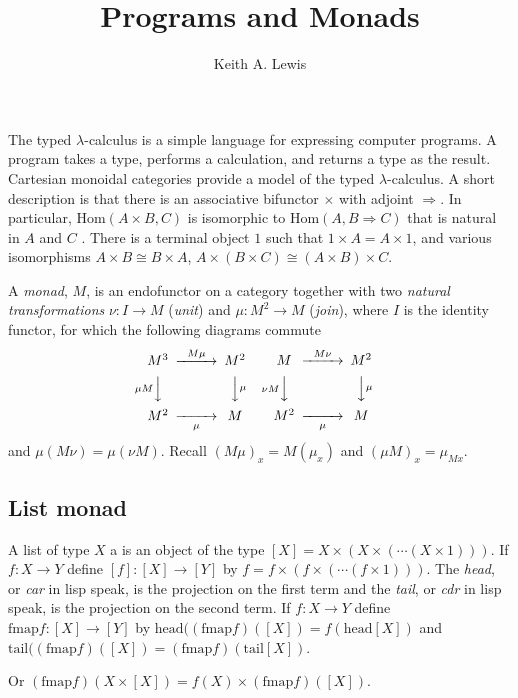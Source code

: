 \documentclass[12pt,letterpaper,fleqn]{report}
\author{Keith A. Lewis}
\title{Programs and Monads}
\begin{document}
\maketitle
The typed \(\lambda\)-calculus is a simple language for expressing computer
programs. A program takes a type, performs a calculation, and returns a
type as the result. Cartesian monoidal categories provide a model of
the typed \(\lambda\)-calculus. A short description is that there is an associative 
bifunctor \(\times\)
with adjoint \(\Rightarrow\).
In particular, \(\mathrm{Hom}(A\times B,C)\) is isomorphic to 
\(\mathrm{Hom}(A,B\Rightarrow C)\) that is natural in \(A\) and \(C\)	.
There is a terminal object \(1\) such that \(1\times A = A\times 1\), and
various isomorphisms \(A\times B\cong B\times A\), \(A\times(B\times C)
\cong (A\times B)\times C\).

A {\em monad}, \(M\), is an endofunctor on a category together with two
{\em natural transformations} \(\nu\colon I\to M\) ({\em unit}) 
and \(\mu\colon M^2\to M\) ({\em join}),
where \(I\) is the identity functor, for which the following diagrams commute
\[
\begin{CD}
M^3 @>{M\mu}>>M^2\\
@V{\mu M}VV	@VV\mu V\\
M^2 @>>\mu> M
\end{CD}
\qquad
\begin{CD}
M @>{M\nu}>>M^2\\
@V{\nu M}VV	@VV\mu V\\
M^2 @>>\mu> M
\end{CD}
\]
and \(\mu(M\nu) = \mu(\nu M)\). Recall \((M\mu)_x = M(\mu_x)\) and
\((\mu M)_x = \mu_{M x}\).

\subsection{List monad}
A list of type \(X\) a is an object of the type \([X] = X\times (X\times(\cdots (X\times 1)))\).
If \(f\colon X\to Y\) define \([f]\colon [X]\to [Y]\) by
\(f = f\times (f\times(\cdots (f\times 1)))\).
The {\em head}, or {\em car} in lisp speak, is the projection on the first term
and the {\em tail}, or {\em cdr} in lisp speak, is the projection on the second term.
If \(f\colon X\to Y\) define \(\mathrm{fmap} f\colon [X]\to [Y]\)
by \(\mathrm{head}((\mathrm{fmap} f)([X]) = f(\mathrm{head}[X])\)
and \(\mathrm{tail}((\mathrm{fmap} f)([X]) = (\mathrm{fmap} f)(\mathrm{tail}[X])\).

Or \((\mathrm{fmap} f)(X\times [X]) = f(X)\times (\mathrm{fmap} f)([X])\).
\end{document}
